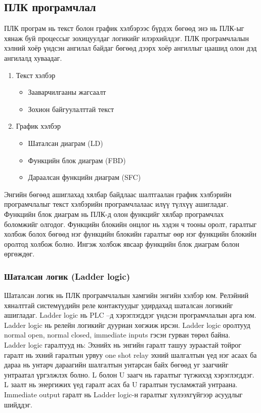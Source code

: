 \subsection{ПЛК програмчлал}
ПЛК програм нь текст болон график хэлбэрээс бүрдэх бөгөөд энэ нь ПЛК-ыг хянаж буй процессыг зохицуулдаг логикийг илэрхийлдэг. ПЛК програмчлалын хэлний хоёр үндсэн ангилал байдаг бөгөөд дээрх хоёр ангиллыг цаашид олон дэд ангилалд хуваадаг. 
\begin{enumerate}
	\item Текст хэлбэр 
	\begin{itemize}
		\item Зааварчилгааны жагсаалт 
		\item Зохион байгуулалттай текст 
	\end{itemize}
\item График хэлбэр 
\begin{itemize}
	\item 	Шаталсан диаграм (LD)
	\item Функцийн блок диаграм (FBD)
	\item Дараалсан функцийн диаграм (SFC)
\end{itemize}
\end{enumerate}
Энгийн бөгөөд ашиглахад хялбар байдлаас шалтгаалан график хэлбэрийн програмчлалыг текст хэлбэрийн програмчлалаас илүү түлхүү ашигладаг. 
Функцийн блок диаграм нь ПЛК-д олон функцийг хялбар програмчлах боломжийг олгодог. Функцийн блокийн онцлог нь хэдэн ч тооны оролт, гаралтыг холбож болох бөгөөд нэг функцийн блокийн гаралтыг өөр нэг функцийн блокийн оролтод холбож болно. Ингэж холбож явсаар функцийн блок диаграм болон өргөждөг.

\subsubsection{Шаталсан логик (Ladder logic) }
Шаталсан логик нь ПЛК програмчлалын хамгийн энгийн хэлбэр юм. Релэйний хяналттай системүүдийн реле контактуудыг удирдахад шаталсан логикийг ашигладаг. Ladder logic нь PLC –д хэрэглэгддэг үндсэн програмчлалын арга юм. Ladder logic нь релейн логикийг дууриан хөгжиж ирсэн. Ladder logic оролтууд normal open, normal closed, immediate inputs гэсэн гурван төрөл байна. \cite{EE343}\\

 Ladder logic гаралтууд нь: 
Эхнийх нь энгийн гаралт ташуу зураастай тойрог гаралт нь эхний гаралтын урвуу one shot relay эхний шалгалтын үед нэг асаах ба дараа нь унтарч дараагийн шалгалтын унтарсан байх бөгөөд уг заагчийг унтраатал үргэлжлэх болно. L болон U заагч нь гаралтыг түгжихэд хэрэглэгддэг. L заалт нь энергижих үед гаралт асах ба U гаралтын тусламжтай унтраана. Immediate output гаралт нь Ladder logic-н гаралтыг хүлээхгүйгээр асуудлыг шийддэг.

